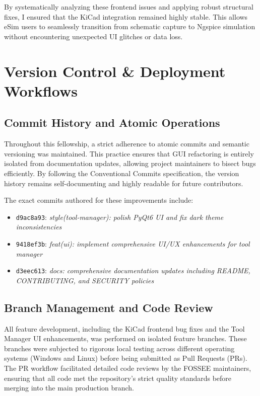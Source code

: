 \documentclass[12pt,a4paper]{report}
\begin{document}
By systematically analyzing these frontend issues and applying robust structural fixes, I ensured that the KiCad integration remained highly stable. This allows eSim users to seamlessly transition from schematic capture to Ngspice simulation without encountering unexpected UI glitches or data loss.

\chapter{Version Control \& Deployment Workflows}

\section{Commit History and Atomic Operations}
Throughout this fellowship, a strict adherence to atomic commits and semantic versioning was maintained. This practice ensures that GUI refactoring is entirely isolated from documentation updates, allowing project maintainers to bisect bugs efficiently. By following the Conventional Commits specification, the version history remains self-documenting and highly readable for future contributors.

The exact commits authored for these improvements include:
\begin{itemize}
    \item \texttt{d9ac8a93}: \textit{style(tool-manager): polish PyQt6 UI and fix dark theme inconsistencies}
    \item \texttt{9418ef3b}: \textit{feat(ui): implement comprehensive UI/UX enhancements for tool manager}
    \item \texttt{d3eec613}: \textit{docs: comprehensive documentation updates including README, CONTRIBUTING, and SECURITY policies}
\end{itemize}

\section{Branch Management and Code Review}
All feature development, including the KiCad frontend bug fixes and the Tool Manager UI enhancements, was performed on isolated feature branches. These branches were subjected to rigorous local testing across different operating systems (Windows and Linux) before being submitted as Pull Requests (PRs). The PR workflow facilitated detailed code reviews by the FOSSEE maintainers, ensuring that all code met the repository's strict quality standards before merging into the main production branch.
\end{document}
